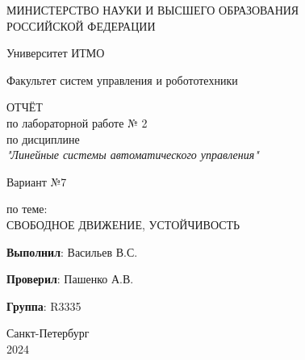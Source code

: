 \thispagestyle{empty}

\begin{center}
    МИНИСТЕРСТВО НАУКИ И ВЫСШЕГО ОБРАЗОВАНИЯ \\ РОССИЙСКОЙ ФЕДЕРАЦИИ

    \vspace{20pt}

    Университет ИТМО

    \vspace{20pt}

    Факультет систем управления и робототехники
\end{center}

\vfill

\begin{center}
    ОТЧЁТ \\  
    по лабораторной работе № 2\\
    по дисциплине \\
    \textit{"Линейные системы автоматического управления"}

    
    \vspace{20pt}
    
    Вариант №7

    \vspace{20pt}

    по теме: \\
    \uppercase{Свободное движение, устойчивость}
\end{center}

\vfill
\hfil

    \noindent \hfill \textbf{Выполнил}: Васильев В.С.

    \vspace{20pt}

    \noindent \hfill \textbf{Проверил}: Пашенко А.В.

    \vspace{20pt}

    \noindent \hfill \textbf{Группа}: R3335

\vfill
\hfil

\begin{center}
    Санкт-Петербург \\ 2024
\end{center}